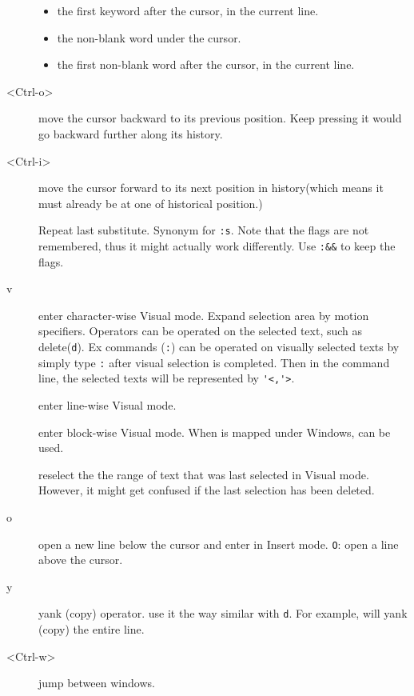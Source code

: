 \documentclass{article}
\newcommand{\syntax}[1]{\PVerb{#1}}
\begin{document}
\begin{description}
\begin{itemize}
  \item the first keyword after the cursor, in the current line.
  \item the non-blank word under the cursor.
  \item the first non-blank word after the cursor, in the current line.
\end{itemize}
\item[<Ctrl-o>] move the cursor backward to its previous position. Keep pressing it would go backward further along its history. 
\item[<Ctrl-i>] move the cursor forward to its next position in history(which means it must already be at one of historical position.)
\item[\syntax{&}] Repeat last substitute. Synonym for \verb|:s|. Note that the flags are not remembered, thus it might actually work differently. Use \verb|:&&| to keep the flags.
\item[v] enter character-wise Visual mode. Expand selection area by motion specifiers. Operators can be operated on the selected text, such as delete(\texttt{d}). Ex commands (\verb|:|) can be operated on visually selected texts by simply type \verb|:| after visual selection is completed. Then in the command line, the selected texts will be represented by \verb|'<,'>|.
\item[\syntax{V}] enter line-wise Visual mode.
\item[\syntax{<C-v>}] enter block-wise Visual mode. When \syntax{<C-v>} is mapped under Windows, \syntax{<C-q>} can be used.
\item[\syntax{gv}] reselect the the range of text that was last selected in Visual mode. However, it might get confused if the last selection has been deleted.
\item[o] open a new line below the cursor and enter in Insert mode. \texttt{O}: open a line above the cursor.
\item[y] yank (copy) operator. use it the way similar with \texttt{d}. For example, \syntax{yy} will yank (copy) the entire line.
\item[<Ctrl-w>] jump between windows.


\end{description}
\end{document}
